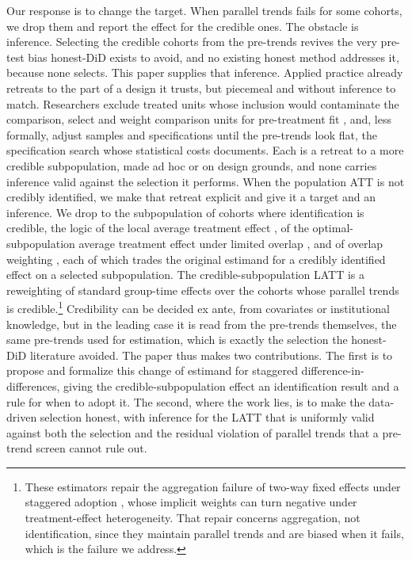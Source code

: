 \documentclass[12pt]{article}
\theoremstyle{remark}
\begin{document}
Our response is to change the target. When parallel trends fails for some cohorts, we drop them and report
the effect for the credible ones. The obstacle is inference. Selecting the credible cohorts from the
pre-trends revives the very pre-test bias honest-DiD exists to avoid, and no existing honest method
addresses it, because none selects. This paper supplies that inference. Applied practice already retreats
to the part of a design it trusts, but piecemeal and without inference to match. Researchers exclude
treated units whose inclusion would contaminate the comparison, select and weight comparison units for
pre-treatment fit \citep{abadie2010}, and, less formally, adjust samples and specifications until the
pre-trends look flat, the specification search whose statistical costs \citet{roth2022pretrends}
documents. Each is a retreat to a more credible subpopulation, made ad hoc or on design grounds, and none
carries inference valid against the selection it performs. When the population ATT is not credibly
identified, we make that retreat explicit and give it a target and an inference. We drop to the
subpopulation of cohorts where identification is credible, the logic of the local average treatment
effect \citep{imbens1994}, of the optimal-subpopulation average treatment effect under limited overlap
\citep{crump2009}, and of overlap weighting \citep{li2018}, each of which trades the original estimand for
a credibly identified effect on a selected subpopulation. The credible-subpopulation LATT is a reweighting
of standard group-time effects \citep{callaway2021} over the cohorts whose parallel trends is
credible.\footnote{These estimators
\citep{callaway2021, sun2021, borusyak2024, dechaisemartin2020} repair the aggregation failure of
two-way fixed effects under staggered adoption \citep{goodmanbacon2021}, whose implicit weights can turn
negative under treatment-effect heterogeneity. That repair concerns aggregation, not identification,
since they maintain parallel trends and are biased when it fails, which is the failure we address.}
Credibility can be decided ex ante, from covariates or institutional knowledge, but in the leading case it
is read from the pre-trends themselves, the same pre-trends used for estimation, which is exactly the
selection the honest-DiD literature avoided. The paper thus makes two contributions. The first is to
propose and formalize this change of estimand for staggered difference-in-differences, giving the
credible-subpopulation effect an identification result and a rule for when to adopt it. The second, where
the work lies, is to make the data-driven selection honest, with inference for the LATT that is uniformly
valid against both the selection and the residual violation of parallel trends that a pre-trend screen
cannot rule out.
\end{document}
